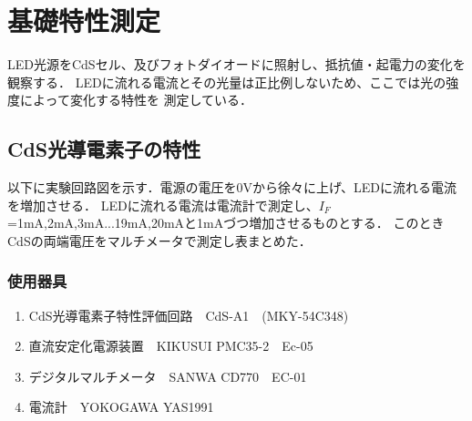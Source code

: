\documentclass[titlepage]{jarticle}
\begin{document}
\section{基礎特性測定}
LED光源をCdSセル、及びフォトダイオードに照射し、抵抗値・起電力の変化を観察する．
LEDに流れる電流とその光量は正比例しないため、ここでは光の強度によって変化する特性を
測定している．
\subsection{CdS光導電素子の特性}
以下に実験回路図を示す．電源の電圧を0Vから徐々に上げ、LEDに流れる電流を増加させる．
LEDに流れる電流は電流計で測定し、$I_F$=1mA,2mA,3mA...19mA,20mAと1mAづつ増加させるものとする．
このときCdSの両端電圧をマルチメータで測定し表まとめた．
\subsubsection{使用器具}
\begin{enumerate}
    \item CdS光導電素子特性評価回路　CdS-A1　(MKY-54C348)
    \item 直流安定化電源装置　KIKUSUI PMC35-2　Ec-05
    \item デジタルマルチメータ　SANWA CD770　EC-01
    \item 電流計　YOKOGAWA YAS1991
\end{enumerate}
\end{document}
